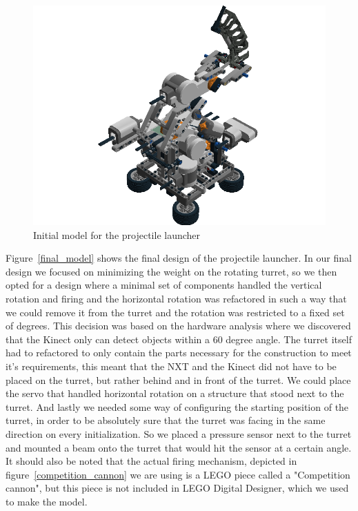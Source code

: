 \begin{figure}[hptb]
  \centering
    \includegraphics[width=1.0\textwidth]{img/Step114.png}
  \caption{Initial model for the projectile launcher}
  \label{first_model}
\end{figure}

Figure~\ref{final_model} shows the final design of the projectile launcher. In our final design we focused on minimizing the weight on the rotating turret, so we then opted for a design where a minimal set of components handled the vertical rotation and firing and the horizontal rotation was refactored in such a way that we could remove it from the turret and the rotation was restricted to a fixed set of degrees. This decision was based on the hardware analysis where we discovered that the Kinect only can detect objects within a 60 degree angle. The turret itself had to refactored to only contain the parts necessary for the construction to meet it's requirements, this meant that the NXT and the Kinect did not have to be placed on the turret, but rather behind and in front of the turret. We could place the servo that handled horizontal rotation on a structure that stood next to the turret. And lastly we needed some way of configuring the starting position of the turret, in order to be absolutely sure that the turret was facing in the same direction on every initialization. So we placed a pressure sensor next to the turret and mounted a beam onto the turret that would hit the sensor at a certain angle. It should also be noted that the actual firing mechanism, depicted in figure~\ref{competition_cannon} we are using is a LEGO piece called a "Competition cannon", but this piece is not included in LEGO Digital Designer, which we used to make the model. 

